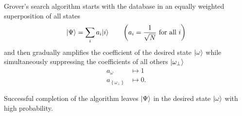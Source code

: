 \documentclass{slides}
\begin{document}
Grover's search algorithm starts with the database in an
equally weighted superposition of all states
\begin{equation*}
{|{\Psi}\rangle} = \sum_{i} a_i{|{i}\rangle}
\qquad \left(a_i = \frac{1}{\sqrt{N}}\text{ for all }i\right)
\end{equation*}
and then gradually amplifies the coefficient of the desired state
${|{\omega}\rangle}$
while simultaneously suppressing the coefficients of all others
${|{\omega_\perp}\rangle}$
\begin{equation*}
\begin{split}
a_{\omega}&\mapsto 1\\
a_{\left\lbrace\omega_\perp\right\rbrace}&\mapsto 0.
\end{split}
\end{equation*}

Successful completion of the algorithm leaves ${|{\Psi}\rangle}$ in the
desired state ${|{\omega}\rangle}$ with high probability.

\pagebreak
%
%
%
\end{document}
